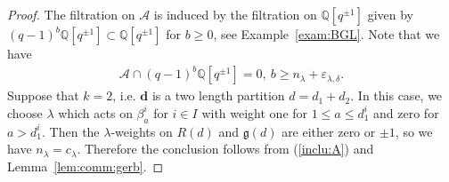 \documentclass [11pt,oneside,a4paper,mathscr]{amsart}
\theoremstyle{definition}
\renewcommand{\leq}{\leqslant}
\renewcommand{\geq}{\geqslant}
\begin{document}
\begin{proof}
The filtration on $\mathscr{A}$ is induced by the filtration on
$\mathbb{Q}[q^{\pm 1}]$ given by 
$(q-1)^b \mathbb{Q}[q^{\pm 1}] \subset \mathbb{Q}[q^{\pm 1}]$
for $b\geq 0$, see Example~\ref{exam:BGL}.  
Note that we have 
\begin{align}\label{inclu:A}
    \mathscr{A} \cap (q-1)^b \mathbb{Q}[q^{\pm 1}] =0, \ b\geq n_{\lambda}+\varepsilon_{\lambda, \delta}. 
\end{align}
Suppose that $k=2$, i.e. $\mathbf{d}$ is a 
two length partition $d=d_1+d_2$. 
In this case, we choose $\lambda$ 
which acts on $\beta^i_a$ for $i\in I$ with weight one 
for $1\leq a \leq d^i_1$ and zero for $a>d^i_1$. 
Then the $\lambda$-weights on $R(d)$ and $\mathfrak{g}(d)$ 
are either zero or $\pm 1$, so we have $n_{\lambda}=c_{\lambda}$. 
Therefore the conclusion follows from (\ref{inclu:A})
and Lemma~\ref{lem:comm:gerb}. 


\end{proof}
\end{document}
